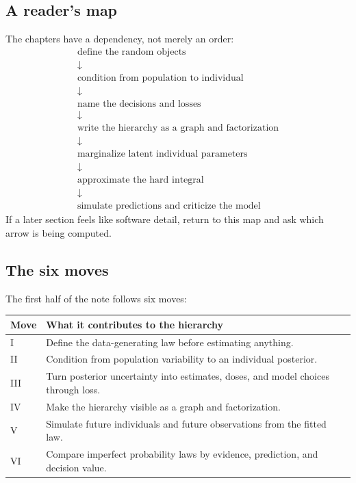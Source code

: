 \documentclass[a4paper]{article}
\begin{document}
\subsection{A reader's map}

The chapters have a dependency, not merely an order:
\[
  \begin{array}{c}
    \text{define the random objects}\\
    \downarrow\\
    \text{condition from population to individual}\\
    \downarrow\\
    \text{name the decisions and losses}\\
    \downarrow\\
    \text{write the hierarchy as a graph and factorization}\\
    \downarrow\\
    \text{marginalize latent individual parameters}\\
    \downarrow\\
    \text{approximate the hard integral}\\
    \downarrow\\
    \text{simulate predictions and criticize the model}
  \end{array}
\]
If a later section feels like software detail, return to this map and ask which arrow is being computed.

\subsection{The six moves}

The first half of the note follows six moves:
\begin{center}
\begin{tabularx}{0.96\textwidth}{p{}X}
\toprule
Move & What it contributes to the hierarchy \\
\midrule
I & Define the data-generating law before estimating anything. \\
II & Condition from population variability to an individual posterior. \\
III & Turn posterior uncertainty into estimates, doses, and model choices through loss. \\
IV & Make the hierarchy visible as a graph and factorization. \\
V & Simulate future individuals and future observations from the fitted law. \\
VI & Compare imperfect probability laws by evidence, prediction, and decision value. \\
\bottomrule
\end{tabularx}
\end{center}
\end{document}
